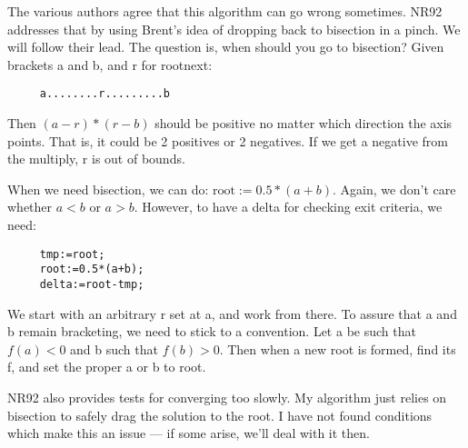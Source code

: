 The various authors agree that this algorithm can go wrong
sometimes.  NR92 addresses that by using Brent's idea of
dropping back to bisection in a pinch.  We will follow their
lead.  The question is, when should you go to bisection?
Given brackets a and b, and r for rootnext:
\begin{verbatim}
     a........r.........b
\end{verbatim}

Then $(a-r)*(r-b)$ should be positive no matter which
direction the axis points.  That is, it could be 2 positives
or 2 negatives.  If we get a negative from the multiply, r
is out of bounds.

When we need bisection, we can do: $\mbox{root}:=0.5*(a+b)$.
Again, we don't care whether $a<b$ or $a>b$.  However, to have a
delta for checking exit criteria, we need:
\begin{verbatim}
     tmp:=root;
     root:=0.5*(a+b);
     delta:=root-tmp;
\end{verbatim}

We start with an arbitrary r set at a, and work from there.
To assure that a and b remain bracketing, we need to stick
to a convention.  Let a be such that $f(a)<0$ and b such that
$f(b)>0$.  Then when a new root is formed, find its f, and set
the proper a or b to root.

NR92 also provides tests for converging too slowly.  My
algorithm just relies on bisection to safely drag the
solution to the root.  I have not found conditions which
make this an issue --- if some arise, we'll deal with it
then.
